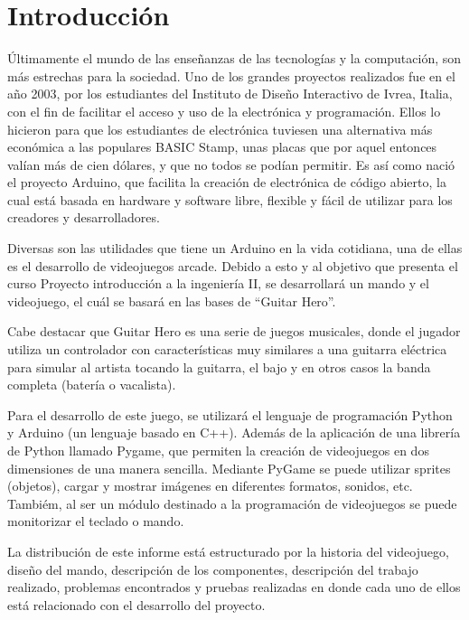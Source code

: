 \documentclass[12pt]{article}
\begin{document}
\section{Introducción}
 \begin{flushleft}
Últimamente el mundo de las enseñanzas de las tecnologías y  la computación, son más estrechas para la sociedad. Uno de los grandes proyectos realizados fue en el año 2003, por los estudiantes del Instituto de Diseño Interactivo de Ivrea, Italia, con el fin de facilitar el acceso y uso de la electrónica y programación. Ellos lo hicieron para que los estudiantes de electrónica tuviesen una alternativa más económica a las populares BASIC Stamp, unas placas que por aquel entonces valían más de cien dólares, y que no todos se podían permitir. 
Es así como nació el proyecto Arduino, que facilita la creación de electrónica de código abierto, la cual está basada en hardware y software libre, flexible y fácil de utilizar para los creadores y desarrolladores.

Diversas son las utilidades que tiene un Arduino en la vida cotidiana, una de ellas es el desarrollo de videojuegos arcade. Debido a esto y al objetivo que presenta el curso Proyecto introducción a la ingeniería II, se desarrollará un mando y el videojuego, el cuál se basará en las bases de “Guitar Hero”.

Cabe destacar que Guitar Hero es una serie de juegos musicales, donde el jugador utiliza un  controlador con características muy similares a una guitarra eléctrica para simular al artista tocando la guitarra, el bajo y en otros casos la banda completa (batería o vacalista). 

Para el desarrollo de este juego, se utilizará el lenguaje de programación Python y Arduino (un lenguaje basado en C++). Además de la aplicación de una librería de Python llamado Pygame, que permiten la creación de videojuegos en dos dimensiones de una manera sencilla. Mediante PyGame se puede utilizar sprites (objetos), cargar y mostrar imágenes en diferentes formatos, sonidos, etc. Tambiém, al ser un módulo destinado a la programación de videojuegos se puede monitorizar el teclado o mando.

La distribución de este informe está estructurado por la historia del videojuego, diseño del mando, descripción de los componentes, descripción del trabajo realizado, problemas encontrados y pruebas realizadas en donde cada uno de ellos está relacionado con el desarrollo del proyecto.
















	\end{flushleft}
	\newpage
	
\end{document}
